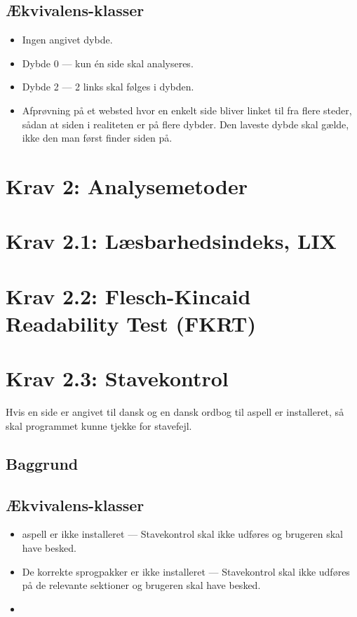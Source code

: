 \documentclass[a4paper,oneside,article, titlepage]{memoir}
\begin{document}
\subsection{Ækvivalens-klasser}
\begin{itemize}
\item Ingen angivet dybde.
\item Dybde 0 --- kun én side skal analyseres.
\item Dybde 2 --- 2 links skal følges i dybden.
\item Afprøvning på et websted hvor en enkelt side bliver linket til
  fra flere steder, sådan at siden i realiteten er på flere
  dybder. Den laveste dybde skal gælde, ikke den man først finder
  siden på.
\end{itemize}

\section*{Krav 2: Analysemetoder}

\section*{Krav 2.1: Læsbarhedsindeks, LIX}

\section*{Krav 2.2: Flesch-Kincaid Readability Test (FKRT)}

\section*{Krav 2.3: Stavekontrol}

Hvis en side er angivet til dansk og en dansk ordbog til aspell er
installeret, så skal programmet kunne tjekke for stavefejl.

\subsection{Baggrund}

\subsection{Ækvivalens-klasser}
\begin{itemize}
\item aspell er ikke installeret --- Stavekontrol skal ikke udføres og
  brugeren skal have besked.
\item De korrekte sprogpakker er ikke installeret --- Stavekontrol
  skal ikke udføres på de relevante sektioner og brugeren skal have
  besked.
\item 
\end{itemize}
\end{document}
